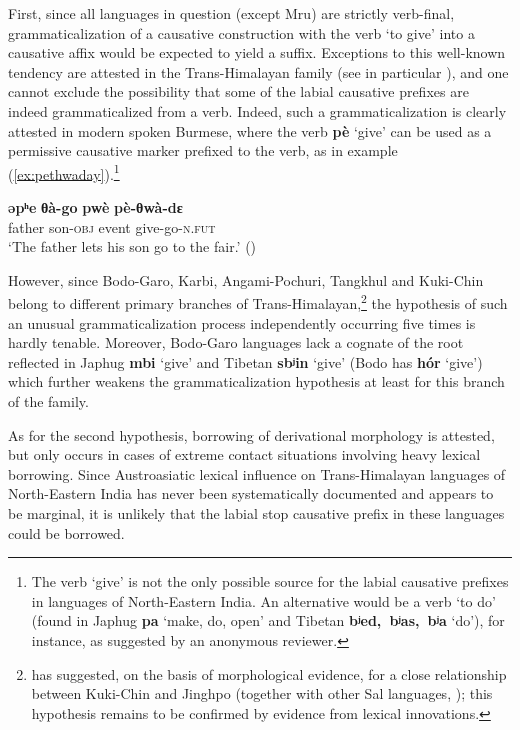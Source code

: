 \documentclass[oneside,a4paper,11pt]{article}
\newcommand{\ipa}[1]{\textbf{{\phon\mbox{#1}}}} %
\newcommand{\forme}[2]{\ipa{#1} `#2'}
\begin{document}
First, since all languages in question (except Mru) are strictly verb-final, grammaticalization of a causative construction with the verb `to give' into a causative affix would be expected to yield a suffix. Exceptions to this well-known tendency are attested in the Trans-Himalayan family (see in particular \citealt{jacques13harmonization}), and one cannot exclude the possibility that some of the labial causative prefixes are indeed grammaticalized from a verb. Indeed, such a grammaticalization is clearly attested in modern spoken Burmese, where the verb \ipa{pè} `give' can be used as a permissive causative marker prefixed to the verb, as in example (\ref{ex:pethwaday}).\footnote{The verb `give' is not the only possible source for the labial causative prefixes in languages of North-Eastern India. An alternative would be a verb `to do' (found in Japhug \forme{pa}{make, do, open} and Tibetan \forme{bʲed, bʲas, bʲa}{do}), for instance, as suggested by an anonymous reviewer. }

\begin{exe}
\ex \label{ex:pethwaday}
\gll \ipa{əpʰe} \ipa{θà-go} \ipa{pwè} \ipa{pè-θwà-dɛ} \\
father son-\textsc{obj} event give-go-\textsc{n.fut} \\
\glt `The father lets his son go to the fair.' (\citealt[196]{jenny16grammar})
\end{exe}

However, since  Bodo-Garo, Karbi, Angami-Pochuri, Tangkhul and Kuki-Chin belong to different primary branches of Trans-Himalayan,\footnote{\citet{delancey15central} has suggested, on the basis of morphological evidence, for a close relationship between Kuki-Chin and Jinghpo (together with other Sal languages, \citealt{burling83sal}); this hypothesis remains to be confirmed by evidence from lexical innovations.} the hypothesis of such an unusual grammaticalization process independently occurring five times is hardly tenable. Moreover, Bodo-Garo languages lack a cognate of the root reflected in Japhug \forme{mbi}{give} and Tibetan \forme{sbʲin}{give} (Bodo has \ipa{hór} `give') which further weakens the grammaticalization hypothesis at least for this branch of the family.

As for the second hypothesis, borrowing of derivational morphology is attested, but only occurs in cases of extreme contact situations involving heavy lexical borrowing. Since Austroasiatic lexical influence on Trans-Himalayan languages of North-Eastern India has never been systematically documented and appears to be marginal, it is unlikely that the labial stop causative prefix in these languages could be borrowed.
\end{document}
